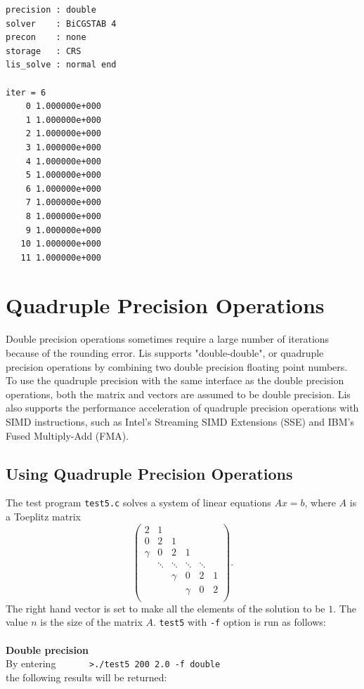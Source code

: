 \documentclass[a4paper]{article}
\begin{document}
\begin{verbatim}
precision : double
solver    : BiCGSTAB 4
precon    : none
storage   : CRS
lis_solve : normal end

iter = 6
    0 1.000000e+000
    1 1.000000e+000
    2 1.000000e+000
    3 1.000000e+000
    4 1.000000e+000
    5 1.000000e+000
    6 1.000000e+000
    7 1.000000e+000
    8 1.000000e+000
    9 1.000000e+000
   10 1.000000e+000
   11 1.000000e+000
\end{verbatim}
\newpage
\section{Quadruple Precision Operations}
\indent
Double precision operations sometimes require a large number of iterations 
because of the rounding error. Lis supports "double-double", 
or quadruple precision operations by 
combining two double precision floating point numbers\cite{dd,qd}.
To use the quadruple precision with the same interface 
as the double precision operations, 
both the matrix and vectors are assumed to be double precision. 
Lis also supports the performance acceleration of quadruple precision
operations with SIMD instructions, such as
Intel's Streaming SIMD Extensions (SSE) and IBM's Fused Multiply-Add (FMA)\cite{quadlis}. 

\subsection{Using Quadruple Precision Operations}
\label{sec:testprog5}
The test program \verb|test5.c| solves a system of linear equations $Ax =b$, where $A$ is a Toeplitz matrix
\[
\left(
\begin{array}{cccccc}
2 & 1 &   &  &  & \\
0 & 2 & 1 &  &  & \\
\gamma & 0& 2 & 1 &  & \\
 & \ddots & \ddots & \ddots & \ddots & \\
 &  &   \gamma &0 &       2   & 1 \\
 &  &  &   \gamma & 0& 2 \\
\end{array}
\right).
\]
The right hand vector is set to make all the elements 
of the solution to be $1$. The value $n$ is the size of the matrix $A$.
\verb|test5| with {\tt -f} option is run as follows: \\
\\
{\bf Double precision}\\
By entering
\verb+      >./test5 200 2.0 -f double+\\
the following results will be returned:
\end{document}
